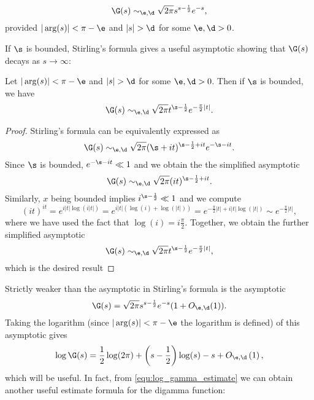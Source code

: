       \begin{theorem}
      \phantom{}
        \[
          \G(s) \sim_{\e,\d} \sqrt{2\pi}s^{s-\frac{1}{2}}e^{-s},
        \]
        provided $|\arg(s)| < \pi-\e$ and $|s| > \d$ for some $\e,\d > 0$.
      \end{theorem}

      If $\s$ is bounded, Stirling's formula gives a useful asymptotic showing that $\G(s)$ decays as $s \to \infty$:
      
      \begin{corollary}\label{equ:weaker_Stirling_formula}
      Let $|\arg(s)| < \pi-\e$ and $|s| > \d$ for some $\e,\d > 0$. Then if $\s$ is bounded, we have
        \[
          \G(s) \sim_{\e,\d} \sqrt{2\pi}t^{\s-\frac{1}{2}}e^{-\frac{\pi}{2}|t|}.
        \]
      \end{corollary}
      \begin{proof}
        Stirling's formula can be equivalently expressed as
        \[
          \G(s) \sim_{\e,\d} \sqrt{2\pi}(\s+it)^{\s-\frac{1}{2}+it}e^{-\s-it}.
        \]
        Since $\s$ is bounded, $e^{-\s-it} \ll 1$ and we obtain the the simplified asymptotic
        \[
          \G(s) \sim_{\e,\d} \sqrt{2\pi}(it)^{\s-\frac{1}{2}+it}.
        \]
        Similarly, $x$ being bounded implies $i^{\s-\frac{1}{2}} \ll 1$ and we compute
        \[
          (it)^{it} = e^{i|t|\log(i|t|)} = e^{i|t|(\log(i)+\log(|t|))} = e^{-\frac{\pi}{2}|t|+i|t|\log(|t|)} \sim e^{-\frac{\pi}{2}|t|},
        \]
        where we have used the fact that $\log(i) = i\frac{\pi}{2}$. Together, we obtain the further simplified asymptotic
        \[
          \G(s) \sim_{\e,\d} \sqrt{2\pi}t^{\s-\frac{1}{2}}e^{-\frac{\pi}{2}|t|},
        \]
        which is the desired result
      \end{proof}
      Strictly weaker than the asymptotic in Stirling's formula is the asymptotic
      \begin{equation}
          \G(s) = \sqrt{2\pi}s^{s-\frac{1}{2}}e^{-s}(1+O_{\e,\d}(1)).
      \end{equation}
      Taking the logarithm (since $|\arg(s)| < \pi-\e$ the logarithm is defined) of this asymptotic gives
      \begin{equation}\label{equ:log_gamma_estimate}
        \log\G(s) = \frac{1}{2}\log(2\pi)+\left(s-\frac{1}{2}\right)\log(s)-s+O_{\e,\d}\left(1\right),
      \end{equation}
      which will be useful. In fact, from \cref{equ:log_gamma_estimate} we can obtain another useful estimate formula for the digamma function:

